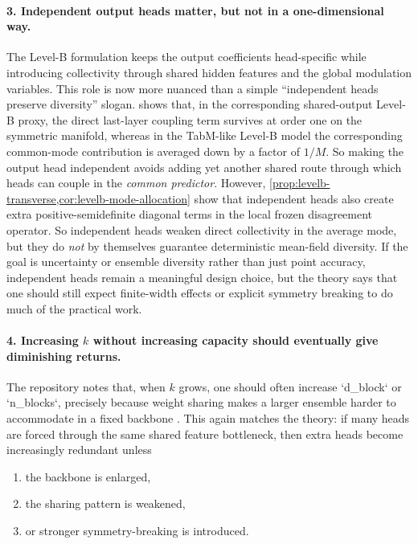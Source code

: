 \documentclass[11pt]{article}
\theoremstyle{definition}
\begin{document}
\paragraph{3. Independent output heads matter, but not in a one-dimensional way.}
The Level-B formulation keeps the output coefficients head-specific while introducing collectivity through shared hidden features and the global modulation variables.
This role is now more nuanced than a simple ``independent heads preserve diversity'' slogan.
 shows that, in the corresponding shared-output Level-B proxy, the direct last-layer coupling term survives at order one on the symmetric manifold, whereas in the TabM-like Level-B model the corresponding common-mode contribution is averaged down by a factor of $1/M$.
So making the output head independent avoids adding yet another shared route through which heads can couple in the \emph{common predictor}.
However, \cref{prop:levelb-transverse,cor:levelb-mode-allocation} show that independent heads also create extra positive-semidefinite diagonal terms in the local frozen disagreement operator.
So independent heads weaken direct collectivity in the average mode, but they do \emph{not} by themselves guarantee deterministic mean-field diversity.
If the goal is uncertainty or ensemble diversity rather than just point accuracy, independent heads remain a meaningful design choice, but the theory says that one should still expect finite-width effects or explicit symmetry breaking to do much of the practical work.

\paragraph{4. Increasing $k$ without increasing capacity should eventually give diminishing returns.}
The repository notes that, when $k$ grows, one should often increase `d\_block` or `n\_blocks`, precisely because weight sharing makes a larger ensemble harder to accommodate in a fixed backbone \cite{tabm-repo}.
This again matches the theory:
if many heads are forced through the same shared feature bottleneck, then extra heads become increasingly redundant unless
\begin{enumerate}[leftmargin=2em]
  \item the backbone is enlarged,
  \item the sharing pattern is weakened,
  \item or stronger symmetry-breaking is introduced.
\end{enumerate}
\end{document}
